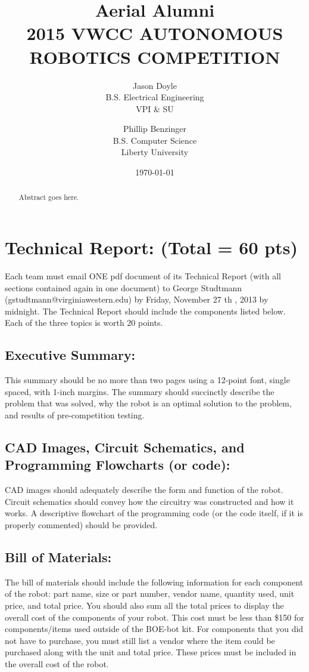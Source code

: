 \documentclass{article}
\title{ Aerial Alumni \\ 2015  VWCC AUTONOMOUS ROBOTICS COMPETITION }
\author{ Jason Doyle \\ B.S. Electrical Engineering \\ VPI \& SU \and Phillip Benzinger \\ B.S. Computer Science \\ Liberty University }
\date{ \today }
\begin{document}
\maketitle

\begin{abstract}
Abstract goes here.
\end{abstract}
\clearpage

\tableofcontents
\listoffigures
\clearpage

\section{ Technical Report: (Total = 60 pts) }
Each team must email ONE pdf document of its Technical Report (with all sections contained again in
one document) to George Studtmann (gstudtmann@virginiawestern.edu) by Friday, November 27 th ,
2013 by midnight. The Technical Report should include the components listed below. Each of the three
topics is worth 20 points.
\subsection{ Executive Summary: }
This summary should be no more than two pages using a 12-point font, single spaced, with 1-inch
margins. The summary should succinctly describe the problem that was solved, why the robot is an optimal
solution to the problem, and results of pre-competition testing.
\subsection{ CAD Images, Circuit Schematics, and Programming Flowcharts (or code): }
CAD images should adequately describe the form and function of the robot. Circuit schematics should
convey how the circuitry was constructed and how it works. A descriptive flowchart of the programming
code (or the code itself, if it is properly commented) should be provided.
\subsection{ Bill of Materials: }
The bill of materials should include the following information for each component of the robot: part
name, size or part number, vendor name, quantity used, unit price, and total price. You should also sum all
the total prices to display the overall cost of the components of your robot. This cost must be less than \$150
for components/items used outside of the BOE-bot kit. For components that you did not have to purchase,
you must still list a vendor where the item could be purchased along with the unit and total price. These
prices must be included in the overall cost of the robot.
\end{document}
